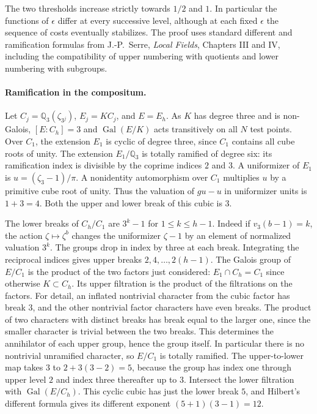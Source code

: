 \documentclass[11pt]{article}
\begin{document}
The two thresholds increase strictly towards $1/2$ and $1$.
In particular the functions of $\epsilon$ differ at every successive
level, although at each fixed $\epsilon$ the sequence of costs eventually
stabilizes. The proof uses standard different and ramification formulas
from J.-P.~Serre, \emph{Local Fields}, Chapters III and IV, including
the compatibility of upper numbering with quotients and lower numbering
with subgroups.

\paragraph{Ramification in the compositum.}
Let $C_j=\mathbb Q_3(\zeta_{3^j})$, $E_j=KC_j$, and $E=E_h$.
As $K$ has degree three and is non-Galois, $[E:C_h]=3$ and
$\operatorname{Gal}(E/K)$ acts transitively on all $N$ test points.
Over $C_1$, the extension $E_1$ is cyclic of degree three, since $C_1$
contains all cube roots of unity. The extension $E_1/\mathbb Q_3$ is
totally ramified of degree six: its ramification index is divisible by
the coprime indices $2$ and $3$. A uniformizer of $E_1$ is
$u=(\zeta_3-1)/\pi$. A nonidentity automorphism over $C_1$ multiplies
$u$ by a primitive cube root of unity. Thus the valuation of $gu-u$
in uniformizer units is $1+3=4$. Both the upper and lower break
of this cubic is $3$.

The lower breaks of $C_h/C_1$ are $3^k-1$ for $1\le k\le h-1$.
Indeed if $v_3(b-1)=k$, the action $\zeta\mapsto\zeta^b$ changes
the uniformizer $\zeta-1$ by an element of normalized valuation $3^k$.
The groups drop in index by three at each break. Integrating the
reciprocal indices gives upper breaks $2,4,\ldots,2(h-1)$.
The Galois group of $E/C_1$ is the product of the two factors just
considered: $E_1\cap C_h=C_1$ since otherwise $K\subset C_h$.
Its upper filtration is the product of the filtrations on the factors.
For detail, an inflated nontrivial character from the cubic factor
has break $3$, and the other nontrivial factor characters have even
breaks. The product of two characters with distinct breaks has break
equal to the larger one, since the smaller character is trivial
between the two breaks. This determines the annihilator of each upper
group, hence the group itself. In particular there is no nontrivial
unramified character, so $E/C_1$ is totally ramified. The upper-to-lower
map takes $3$ to $2+3(3-2)=5$, because the group has index one
through upper level $2$ and index three thereafter up to $3$.
Intersect the lower filtration with $\operatorname{Gal}(E/C_h)$.
This cyclic cubic has just the lower break $5$, and Hilbert's
different formula gives its different exponent $(5+1)(3-1)=12$.
\end{document}
